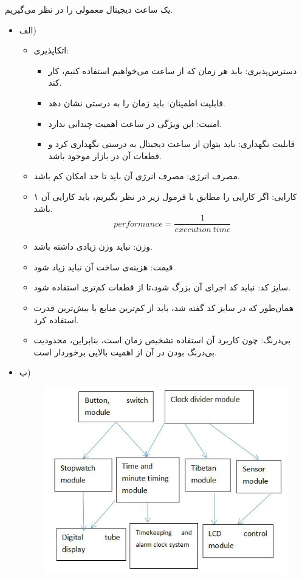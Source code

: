 
یک ساعت دیجیتال معمولی را در نظر می‌گیریم.

\begin{itemize}
	\item الف)
	\begin{itemize}
		\item اتکاپذیری:
			\begin{itemize}
				\item دسترس‌پذیری:
				 باید هر زمان که از ساعت می‌خواهیم استفاده کنیم، کار کند.
				 \item قابلیت اطمینان:
				 باید زمان را به درستی نشان دهد. 
				 \item امنیت:
				 این ویژگی در ساعت اهمیت چندانی ندارد.
				\item قابلیت نگهداری:
				 باید بتوان از ساعت دیجیتال به درستی نگهداری کرد و قطعات آن در بازار موجود باشد.  
			\end{itemize}
		\item مصرف انرژی: مصرف انرژی آن باید تا حد امکان کم باشد.
		\item کارایی:
		اگر کارایی را مطابق با فرمول زیر در نظر بگیریم، باید کارایی آن ۱ باشد. 
		$$performance = \frac{1}{execution\: time}$$
		\item وزن:
		نباید وزن زیادی داشته باشد.
		\item قیمت:
		هزینه‌ی ساخت آن نباید زیاد شود.
		\item سایز کد:
		نباید کد اجرای آن  بزرگ شود،تا از قطعات کم‌تری استفاده شود. 
		\item همان‌طور که در سایز کد گفته شد، باید از کم‌ترین منابع با بیش‌ترین قدرت استفاده کرد.
		\item بی‌درنگ:
		چون کاربرد آن استفاده تشخیص زمان است، بنابراین، محدودیت بی‌درنگ بودن در آن از اهمیت بالایی برخوردار است.
	\end{itemize}
	\item ب)
	\begin{figure}[!hbpt]
		\centering
		\includegraphics[scale=0.6]{img/a.jpeg}

\end{figure}
\end{itemize}
